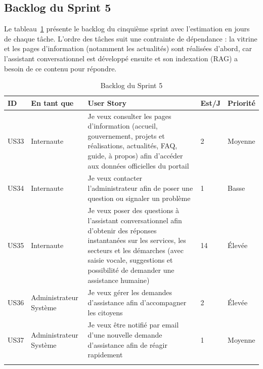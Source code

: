 \subsection{Backlog du Sprint 5}

Le tableau~\ref{tab:user-stories-sprint5} présente le backlog du cinquième sprint avec l'estimation en jours de chaque tâche. L'ordre des tâches suit une contrainte de dépendance : la vitrine et les pages d'information (notamment les actualités) sont réalisées d'abord, car l'assistant conversationnel est développé ensuite et son indexation (RAG) a besoin de ce contenu pour répondre.

 \renewcommand{\arraystretch}{1.3}

\begin{longtable}{|p{1cm}|p{3cm}|p{7cm}|p{1cm}|p{2cm}|}

\hline
\rowcolor{orange!30}
\textbf{ID} & \textbf{En tant que} & \textbf{User Story} & \textbf{Est/J} & \textbf{Priorité} \\ 
\hline
\endfirsthead

 

US33 & Internaute & 
Je veux consulter les pages d'information (accueil, gouvernement, projets et réalisations, actualités, FAQ, guide, à propos) afin d'accéder aux données officielles du portail & 
2 & Moyenne \\ \hline

US34 & Internaute & 
Je veux contacter l'administrateur afin de poser une question ou signaler un problème & 
1 & Basse \\ \hline

US35 & Internaute & 
Je veux poser des questions à l'assistant conversationnel afin d'obtenir des réponses instantanées sur les services, les secteurs et les démarches (avec saisie vocale, suggestions et possibilité de demander une assistance humaine) & 
14 & Élevée \\ \hline

US36 & Administrateur Système & 
Je veux gérer les demandes d'assistance afin d'accompagner les citoyens & 
2 & Élevée \\ \hline

US37 & Administrateur Système & 
Je veux être notifié par email d'une nouvelle demande d'assistance afin de réagir rapidement & 
1 & Moyenne \\ \hline


\caption{Backlog du Sprint 5}
\label{tab:user-stories-sprint5}

\end{longtable}

